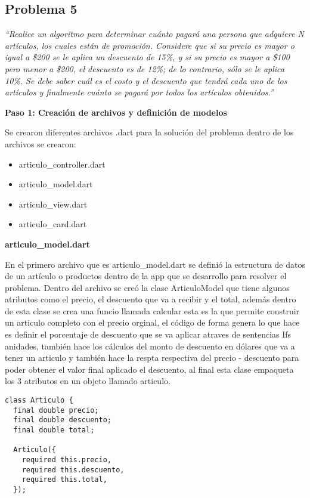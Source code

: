\subsection{Problema 5}

\textit {“Realice un algoritmo para determinar cuánto pagará una persona que adquiere N artículos, los cuales están de promoción. Considere que si su precio es mayor o igual a \$200 se le aplica un descuento de 15\%, y si su precio es mayor a \$100 pero menor a \$200, el descuento es de 12\%; de lo contrario, sólo se le aplica 10\%. Se debe saber cuál es el costo y el descuento que tendrá cada uno de los artículos y finalmente cuánto se pagará por todos los artículos obtenidos.”}

\textbf{Paso 1: Creación de archivos y definición de modelos}

Se crearon diferentes archivos .dart para la solución del problema dentro de los archivos se crearon: 
\begin{itemize}
    \item articulo\_controller.dart
    \item articulo\_model.dart
    \item articulo\_view.dart
    \item articulo\_card.dart
\end{itemize}

\textbf{articulo\_model.dart}

En el primero archivo que es articulo\_model.dart se definió la estructura de datos de un artículo o productos dentro de la app que se desarrollo para resolver el problema. Dentro del archivo se creó la clase ArticuloModel que tiene algunos atributos como el precio, el descuento que va a recibir y el total, además dentro de esta clase se crea una funcio llamada calcular esta es la que permite construir un articulo completo con el precio orginal, el código de forma genera lo que hace es definir el porcentaje de descuento que se va aplicar atraves de sentencias Ifs anidades, también hace los cálculos del monto de descuento en dólares que va a tener un articulo y también hace la respta respectiva del precio  - descuento para poder obtener el valor final aplicado el descuento, al final esta clase empaqueta los 3 atributos en un objeto llamado articulo.


\begin{center}
\begin{lstlisting}
class Articulo {
  final double precio;
  final double descuento;
  final double total;

  Articulo({
    required this.precio,
    required this.descuento,
    required this.total,
  });
\end{lstlisting}
\end{center}


